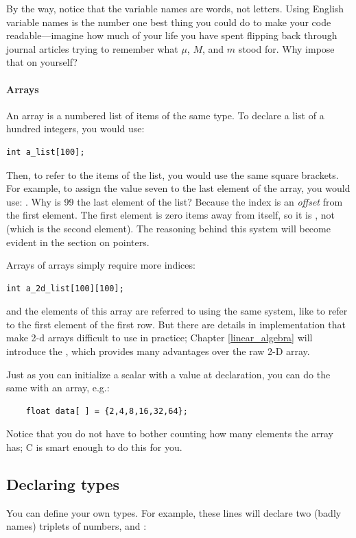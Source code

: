 \documentclass[12pt]{article}
\makeatletter
\def\ind#1{\index{#1}#1}
\def\cindex#1{\index{#1@\cinline{#1}}}
\makeatother
\begin{document}
By the way, notice that the variable names are words, not letters. Using
English variable names is the number one best thing you could do to make your code
readable---imagine how much of your life you have spent flipping back
through journal articles trying to remember what $\mu$, $M$, and $m$
stood for. Why impose that on yourself?

\paragraph{Arrays} An \ind{array} is a numbered list of items of the same type. To declare a list of a hundred
integers, you would use:
\begin{lstlisting}
int a_list[100];
\end{lstlisting}
Then, to refer to the items of the list, you would use the same square
brackets. For example, to assign the value seven to the last element
of the array, you would use: . Why is 99 the last
element of the list? Because the index is an {\sl offset} from the first
element. The first element is zero items away from itself, so it is
, not  (which is the second element).
The reasoning behind this system will become evident in the section
on pointers.

Arrays of arrays simply require more indices:\\
\begin{lstlisting}
int a_2d_list[100][100];
\end{lstlisting}
and the elements of this array are referred to using the same system,
like 
 to refer to the first element of the first row.
But there are details in implementation that make 2-d arrays difficult
to use in practice; Chapter \ref{linear_algebra} will introduce
the , which provides many advantages over the raw
2-D array.

Just as you can initialize a scalar with a value at declaration, you can
do the same with an array, e.g.:
\begin{lstlisting}
    float data[ ] = {2,4,8,16,32,64};
\end{lstlisting}
Notice that you do not have to bother counting how many elements the
array has; C is smart enough to do this for you.

\subsection{Declaring types}\cindex{typedef}  
You can define your own
types. For example, these lines will declare two (badly names) triplets
of numbers,  and :
\end{document}

